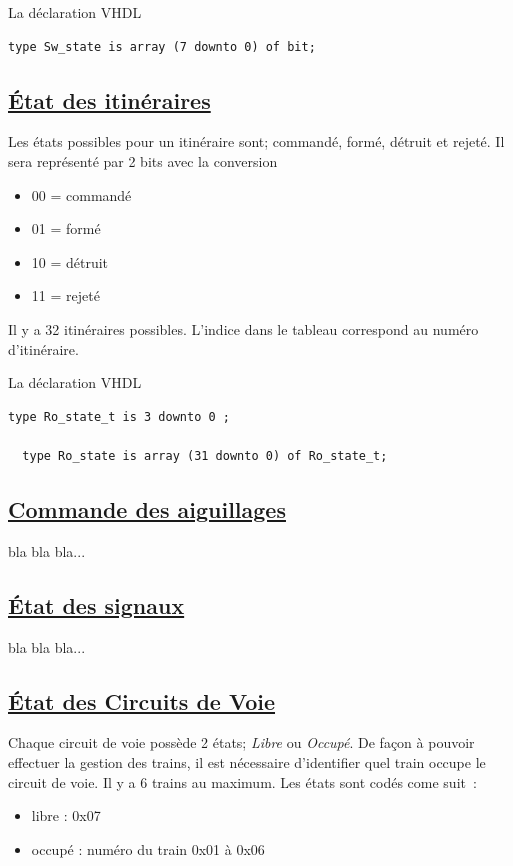 \medskip
La déclaration VHDL
\begin{lstlisting}[style=vhdl]
  type Sw_state is array (7 downto 0) of bit;
\end{lstlisting}


\subsection{\underline{\'Etat des itinéraires}}
\label{sec:st_iti}

Les états possibles pour un itinéraire sont; commandé, formé, détruit
et rejeté. Il sera représenté par 2 bits avec la conversion
\begin{itemize} 
\item 00 = commandé
\item 01 = formé
\item 10 = détruit
\item 11 = rejeté
\end{itemize}

Il y a 32 itinéraires possibles. L'indice dans le tableau correspond
au numéro d'itinéraire.

\medskip
La déclaration VHDL
\begin{lstlisting}[style=vhdl]
  type Ro_state_t is 3 downto 0 ;

  type Ro_state is array (31 downto 0) of Ro_state_t;
\end{lstlisting}


\subsection{\underline{Commande des aiguillages}}
\label{sec:cmd_aig}

bla bla bla...

\subsection{\underline{\'Etat des signaux}}
\label{sec:st_sig}

bla bla bla...

  
\subsection{\underline{\'Etat des Circuits de Voie}}
\label{sec:st_sig}

Chaque circuit de voie possède 2 états; \emph{Libre} ou
\emph{Occupé}. De façon à pouvoir effectuer la gestion des trains, il
est nécessaire d'identifier quel train occupe le circuit de voie.  Il
y a 6 trains au maximum. Les états sont codés come suit~:
\begin{itemize}
  \item libre : 0x07
  \item occupé : numéro du train 0x01 à 0x06
\end{itemize}  

